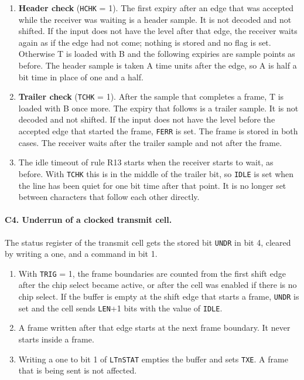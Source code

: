 \documentclass[10pt,a4paper]{article}
\newcommand{\reg}[1]{\texttt{#1}}
\begin{document}
\begin{enumerate}[label=\textbf{F\arabic*},leftmargin=2.6em,start=10]
\item \textbf{Header check} (\reg{HCHK} = 1). The first expiry after an edge that was accepted while the receiver
was waiting is a header sample. It is not decoded and not shifted. If the input does not have the level
after that edge, the receiver waits again as if the edge had not come; nothing is stored and no flag is set.
Otherwise T is loaded with B and the following expiries are sample points as before. The header sample is taken
A time units after the edge, so A is half a bit time in place of one and a half.
\item \textbf{Trailer check} (\reg{TCHK} = 1). After the sample that completes a frame, T is loaded with B once more.
The expiry that follows is a trailer sample. It is not decoded and not shifted. If the input does not have the
level before the accepted edge that started the frame, \reg{FERR} is set. The frame is stored in both cases.
The receiver waits after the trailer sample and not after the frame.
\item The idle timeout of rule R13 starts when the receiver starts to wait, as before. With \reg{TCHK} this is in
the middle of the trailer bit, so \reg{IDLE} is set when the line has been quiet for one bit time after that
point. It is no longer set between characters that follow each other directly.
\end{enumerate}

\paragraph{C4. Underrun of a clocked transmit cell.} The status register of the transmit cell gets the stored bit
\reg{UNDR} in bit 4, cleared by writing a one, and a command in bit 1.

\begin{enumerate}[label=\textbf{U\arabic*},leftmargin=2.6em,start=20]
\item With \reg{TRIG} = 1, the frame boundaries are counted from the first shift edge after the chip select became
active, or after the cell was enabled if there is no chip select. If the buffer is empty at the shift edge that
starts a frame, \reg{UNDR} is set and the cell sends \reg{LEN}+1 bits with the value of \reg{IDLE}.
\item A frame written after that edge starts at the next frame boundary. It never starts inside a frame.
\item Writing a one to bit 1 of \reg{LTnSTAT} empties the buffer and sets \reg{TXE}. A frame that is being sent is
not affected.
\end{enumerate}
\end{document}
